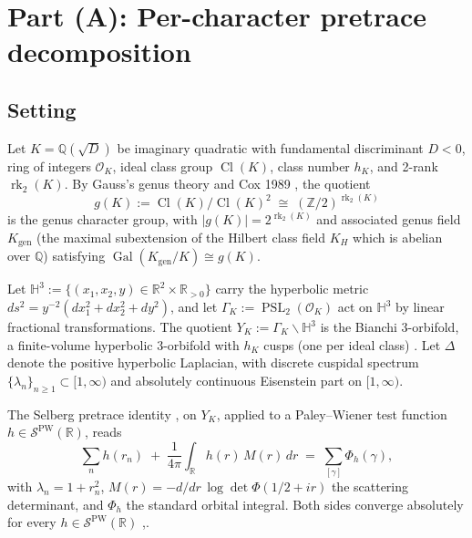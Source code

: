 \documentclass[11pt,a4paper,reqno]{amsart}
\theoremstyle{definition}
\DeclareMathOperator{\PSL}{PSL}
\DeclareMathOperator{\Cl}{Cl}
\DeclareMathOperator{\Gal}{Gal}
\DeclareMathOperator{\rk}{rk}
\newcommand{\OK}{\mathcal{O}_K}
\newcommand{\HH}{\mathbb{H}}
\newcommand{\RR}{\mathbb{R}}
\newcommand{\QQ}{\mathbb{Q}}
\newcommand{\ZZ}{\mathbb{Z}}
\newcommand{\YK}{Y_K}
\newcommand{\GK}{\Gamma_K}
\newcommand{\gK}{g(K)}
\newcommand{\Kgen}{K_{\mathrm{gen}}}
\newcommand{\KH}{K_H}
\newcommand{\PW}{\mathcal{S}^{\mathrm{PW}}}
\begin{document}
\section{Part (A): Per-character pretrace decomposition}\label{sec:thm-A}

\subsection{Setting}\label{ss:Asetting}

Let $K=\QQ(\sqrt{D})$ be imaginary quadratic with fundamental discriminant
$D<0$, ring of integers $\OK$, ideal class group $\Cl(K)$, class number $h_K$,
and 2-rank $\rk_2(K)$.  By Gauss's genus theory \cite{Gauss1801} and Cox 1989
\cite[Thm.~7.7]{Cox1989}, the quotient
\[
  \gK := \Cl(K)/\Cl(K)^2 \;\cong\; (\ZZ/2)^{\rk_2(K)}
\]
is the genus character group, with $|\gK|=2^{\rk_2(K)}$ and associated genus
field $\Kgen$ (the maximal subextension of the Hilbert class field $\KH$ which
is abelian over $\QQ$) satisfying $\Gal(\Kgen/K)\cong\gK$.

Let $\HH^3 := \{(x_1,x_2,y)\in\RR^2\times\RR_{>0}\}$ carry the hyperbolic
metric $ds^2 = y^{-2}(dx_1^2+dx_2^2+dy^2)$, and let
$\GK := \PSL_2(\OK)$ act on $\HH^3$ by linear fractional transformations.
The quotient $\YK := \GK\backslash\HH^3$ is the Bianchi 3-orbifold, a
finite-volume hyperbolic 3-orbifold with $h_K$ cusps (one per ideal class)
\cite[\S1.5 Cor.~5.5]{ElstrodtGrunewaldMennicke1998}.  Let $\Delta$ denote the
positive hyperbolic Laplacian, with discrete cuspidal spectrum
$\{\lambda_n\}_{n\ge 1}\subset[1,\infty)$ and absolutely continuous Eisenstein
part on $[1,\infty)$.

The Selberg pretrace identity \cite{Selberg1956},\cite[\S6.5]{ElstrodtGrunewaldMennicke1998}
on $\YK$, applied to a Paley--Wiener test function $h\in\PW(\RR)$, reads
\begin{equation}\label{eq:globalpretrace}
  \sum_n h(r_n) \;+\; \frac{1}{4\pi}\int_{\RR} h(r)\,M(r)\,dr
  \;=\; \sum_{[\gamma]}\Phi_h(\gamma),
\end{equation}
with $\lambda_n=1+r_n^2$, $M(r)=-d/dr\,\log\det\Phi(1/2+ir)$ the scattering
determinant, and $\Phi_h$ the standard orbital integral.  Both sides converge
absolutely for every $h\in\PW(\RR)$
\cite[\S6.4]{ElstrodtGrunewaldMennicke1998},\cite[\S2.2]{BunkeOlbrich1995}.
\end{document}
